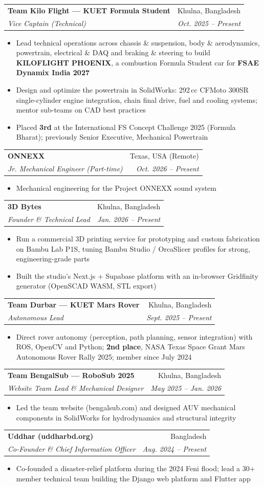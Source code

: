 \documentclass[letterpaper,11pt]{article}
\makeatletter
\newcommand{\resumeItem}[1]{\item\small{{#1 \vspace{-2pt}}}}
\newcommand{\resumeSubheading}[4]{
  \vspace{-2pt}\item
    \begin{tabular*}{0.97\textwidth}[t]{l@{\extracolsep{\fill}}r}
      \textbf{#1} & #2 \\
      \textit{\small#3} & \textit{\small #4} \\
    \end{tabular*}\vspace{-7pt}
}
\newcommand{\resumeItemListStart}{\begin{itemize}}
\newcommand{\resumeItemListEnd}{\end{itemize}\vspace{-5pt}}
\makeatother
\begin{document}
    \resumeSubheading
      {Team Kilo Flight --- KUET Formula Student}{Khulna, Bangladesh}
      {Vice Captain (Technical)}{Oct. 2025 -- Present}
      \resumeItemListStart
        \resumeItem{Lead technical operations across chassis \& suspension, body \& aerodynamics, powertrain, electrical \& DAQ and braking \& steering to build \textbf{KILOFLIGHT PHOENIX}, a combustion Formula Student car for \textbf{FSAE Dynamix India 2027}}
        \resumeItem{Design and optimize the powertrain in SolidWorks: 292\,cc CFMoto 300SR single-cylinder engine integration, chain final drive, fuel and cooling systems; mentor sub-teams on CAD best practices}
        \resumeItem{Placed \textbf{3rd} at the International FS Concept Challenge 2025 (Formula Bharat); previously Senior Executive, Mechanical Powertrain}
      \resumeItemListEnd

    \resumeSubheading
      {ONNEXX}{Texas, USA (Remote)}
      {Jr. Mechanical Engineer (Part-time)}{Oct. 2026 -- Present}
      \resumeItemListStart
        \resumeItem{Mechanical engineering for the Project ONNEXX sound system}
      \resumeItemListEnd

    \resumeSubheading
      {3D Bytes}{Khulna, Bangladesh}
      {Founder \& Technical Lead}{Jan. 2026 -- Present}
      \resumeItemListStart
        \resumeItem{Run a commercial 3D printing service for prototyping and custom fabrication on Bambu Lab P1S, tuning Bambu Studio / OrcaSlicer profiles for strong, engineering-grade parts}
        \resumeItem{Built the studio's Next.js + Supabase platform with an in-browser Gridfinity generator (OpenSCAD WASM, STL export)}
      \resumeItemListEnd

    \resumeSubheading
      {Team Durbar --- KUET Mars Rover}{Khulna, Bangladesh}
      {Autonomous Lead}{Sept. 2025 -- Present}
      \resumeItemListStart
        \resumeItem{Direct rover autonomy (perception, path planning, sensor integration) with ROS, OpenCV and Python; \textbf{2nd place}, NASA Texas Space Grant Mars Autonomous Rover Rally 2025; member since July 2024}
      \resumeItemListEnd

    \resumeSubheading
      {Team BengalSub --- RoboSub 2025}{Khulna, Bangladesh}
      {Website Team Lead \& Mechanical Designer}{May 2025 -- Jan. 2026}
      \resumeItemListStart
        \resumeItem{Led the team website (bengalsub.com) and designed AUV mechanical components in SolidWorks for hydrodynamics and structural integrity}
      \resumeItemListEnd

    \resumeSubheading
      {Uddhar (uddharbd.org)}{Bangladesh}
      {Co-Founder \& Chief Information Officer}{Aug. 2024 -- Present}
      \resumeItemListStart
        \resumeItem{Co-founded a disaster-relief platform during the 2024 Feni flood; lead a 30+ member technical team building the Django web platform and Flutter app}
      \resumeItemListEnd
\end{document}
